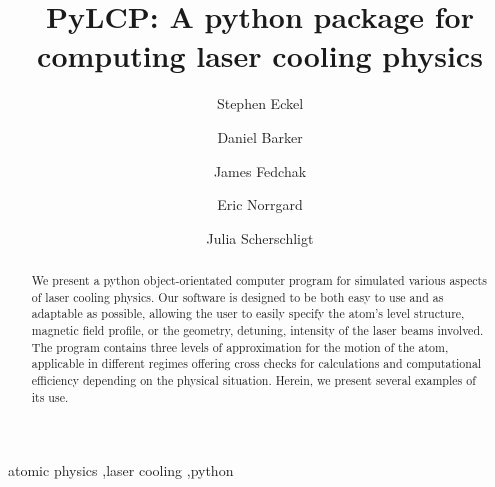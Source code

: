 \documentclass[final,5p,times,twocolumn]{elsarticle}
\begin{document}
\begin{frontmatter}



\title{PyLCP: A python package for computing laser cooling physics}


\author[a]{Stephen Eckel}
\author[a]{Daniel Barker}
\author[a]{James Fedchak}
\author[a]{Eric Norrgard}
\author[a]{Julia Scherschligt}

\address[a]{National Institute of Standards and Technology, Sensor Sciences Division, 100 Bureau Dr., Gaithersburg, MD 20899}

\begin{abstract}
We present a python object-orientated computer program for simulated various aspects of laser cooling physics.  Our software is designed to be both easy to use and as adaptable as possible, allowing the user to easily specify the atom's level structure, magnetic field profile, or the geometry, detuning, intensity of the laser beams involved.  The program contains three levels of approximation for the motion of the atom, applicable in different regimes offering cross checks for calculations and computational efficiency depending on the physical situation.  Herein, we present several examples of its use.
\end{abstract}

\begin{keyword}
atomic physics \sep laser cooling \sep python
\end{keyword}

\end{frontmatter}
\end{document}
